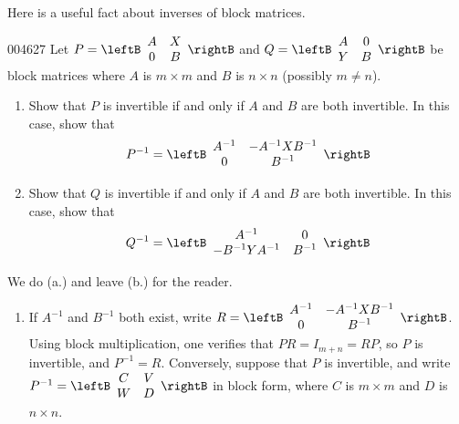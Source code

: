 Here is a useful fact about inverses of block matrices.


\begin{example}{}{004627}
Let $P = \leftB \begin{array}{cc}
A & X \\
0 & B
\end{array} \rightB$
 and $Q = \leftB \begin{array}{cc}
 A & 0 \\
 Y & B
 \end{array} \rightB$
 be block matrices where $A$ is $m \times m$ and $B$ is $n \times n$ (possibly $m \neq n$).


\begin{enumerate}[label={\alph*.}]
\item Show that $P$ is invertible if and only if $A$ and $B$ are both invertible. In this case, show that 
\begin{equation*}
P^{-1} = \leftB \begin{array}{cc}
A^{-1} & -A^{-1}XB^{-1} \\
0 & B^{-1}
\end{array} \rightB
\end{equation*}


\item Show that $Q$ is invertible if and only if $A$ and $B$ are both invertible. In this case, show that 
\begin{equation*}
Q^{-1} = \leftB \begin{array}{cc}
A^{-1} & 0 \\
-B^{-1}YA^{-1} & B^{-1}
\end{array} \rightB
\end{equation*}


\end{enumerate}

\begin{solution}
  We do (a.) and leave (b.) for the reader.


\begin{enumerate}[label={\alph*.}]
\item If $A^{-1}$ and $B^{-1}$ both exist, write $R = \leftB \begin{array}{cc}
A^{-1} & -A^{-1}XB^{-1} \\
0 & B^{-1}
\end{array} \rightB$. Using block multiplication, one verifies that $PR = I_{m+n} = RP$, so $P$ is invertible, and $P^{-1} = R$. Conversely, suppose that $P$ is invertible, and write $P^{-1} = \leftB \begin{array}{cc}
 C & V \\
 W & D
 \end{array} \rightB$
 in block form, where $C$ is $m \times m$ and $D$ is $n \times n$.



\end{enumerate}
\end{solution}
\end{example}
